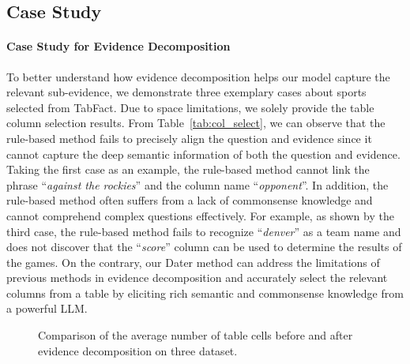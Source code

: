 \subsection{Case Study}
\paragraph{Case Study for Evidence Decomposition}
To better understand how evidence decomposition helps our model capture the relevant sub-evidence, we demonstrate 
three exemplary cases about sports selected from TabFact. Due to space limitations, we solely provide the table column selection results. From Table~\ref{tab:col_select}, we can observe that the rule-based method fails to precisely align the question and evidence since it cannot capture the deep semantic information of both the question and evidence. Taking the first case as an example, the rule-based method cannot link the phrase ``\textit{against the rockies}'' and the column name ``\textit{opponent}''.  In addition, the rule-based method often suffers from a lack of commonsense knowledge and cannot comprehend complex questions effectively. For example, as shown by the third case, the rule-based method fails to recognize ``\textit{denver}'' as a team name and does not discover that the ``\textit{score}'' column can be used to determine the results of the games. 
On the contrary, our Dater method can address the limitations of previous methods in evidence decomposition and accurately select the relevant columns from a table by eliciting rich semantic and commonsense knowledge from a powerful LLM. 

\begin{wrapfigure}{l}{0.5\textwidth}
\caption{Comparison of the average number of table cells before and after evidence decomposition on three dataset.}
\label{fig:table_cell}
\end{wrapfigure}

